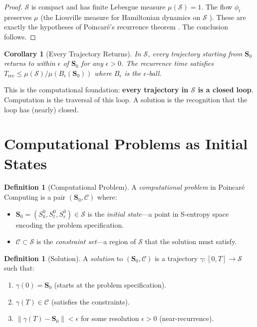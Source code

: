 \documentclass[twocolumn,10pt,a4paper]{article}
\theoremstyle{plain}
\newtheorem{corollary}[theorem]{Corollary}
\theoremstyle{definition}
\newtheorem{definition}[theorem]{Definition}
\theoremstyle{remark}
\newcommand{\Sspace}{\mathcal{S}}
\newcommand{\Sk}{S_k}
\newcommand{\St}{S_t}
\newcommand{\Se}{S_e}
\newcommand{\Scoord}{\mathbf{S}}
\newcommand{\trajectory}{\gamma}
\begin{document}
\begin{proof}
$\Sspace$ is compact and has finite Lebesgue measure $\mu(\Sspace) = 1$. The flow $\phi_t$ preserves $\mu$ (the Liouville measure for Hamiltonian dynamics on $\Sspace$ \cite{liouville1838}). These are exactly the hypotheses of Poincar\'{e}'s recurrence theorem \cite{poincare1890}. The conclusion follows.
\end{proof}

\begin{corollary}[Every Trajectory Returns]
\label{cor:returns}
In $\Sspace$, every trajectory starting from $\Scoord_0$ returns to within $\epsilon$ of $\Scoord_0$ for any $\epsilon > 0$. The recurrence time satisfies $T_{\mathrm{rec}} \leq \mu(\Sspace)/\mu(B_\epsilon(\Scoord_0))$ where $B_\epsilon$ is the $\epsilon$-ball.
\end{corollary}

This is the computational foundation: \textbf{every trajectory in $\Sspace$ is a closed loop}. Computation is the traversal of this loop. A solution is the recognition that the loop has (nearly) closed.

\section{Computational Problems as Initial States}
\label{sec:problems}

\begin{definition}[Computational Problem]
\label{def:problem}
A \emph{computational problem} in Poincar\'{e} Computing is a pair $(\Scoord_0, \mathcal{C})$ where:
\begin{itemize}
    \item $\Scoord_0 = (\Sk^0, \St^0, \Se^0) \in \Sspace$ is the \emph{initial state}---a point in S-entropy space encoding the problem specification.
    \item $\mathcal{C} \subset \Sspace$ is the \emph{constraint set}---a region of $\Sspace$ that the solution must satisfy.
\end{itemize}
\end{definition}

\begin{definition}[Solution]
\label{def:solution}
A \emph{solution} to $(\Scoord_0, \mathcal{C})$ is a trajectory $\trajectory : [0, T] \to \Sspace$ such that:
\begin{enumerate}
    \item $\trajectory(0) = \Scoord_0$ (starts at the problem specification).
    \item $\trajectory(T) \in \mathcal{C}$ (satisfies the constraints).
    \item $\|\trajectory(T) - \Scoord_0\| < \epsilon$ for some resolution $\epsilon > 0$ (near-recurrence).
\end{enumerate}
\end{definition}
\end{document}
